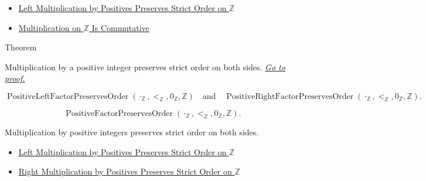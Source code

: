 \begin{dependencies}
\begin{itemize}
  \item \hyperref[thm:left-positive-multiplication-preserves-strict-order-on-z]{Left Multiplication by Positives Preserves Strict Order on $\mathbb{Z}$}
  \item \hyperref[thm:multiplication-on-z-commutative]{Multiplication on $\mathbb{Z}$ Is Commutative}
\end{itemize}
\end{dependencies}

\begin{theorembox}{Theorem}
\begin{theorem}
\label{thm:positive-multiplication-preserves-strict-order-on-z}
Multiplication by a positive integer preserves strict order on both sides.
\hyperref[prf:positive-multiplication-preserves-strict-order-on-z]{\textit{Go to proof.}}
\end{theorem}
\end{theorembox}

\begin{remark*}
\[
\operatorname{PositiveLeftFactorPreservesOrder}(\cdot_{\mathbb{Z}},<_{\mathbb{Z}},0_{\mathbb{Z}},\mathbb{Z})
\quad\text{and}\quad
\operatorname{PositiveRightFactorPreservesOrder}(\cdot_{\mathbb{Z}},<_{\mathbb{Z}},0_{\mathbb{Z}},\mathbb{Z}).
\]
\end{remark*}

\begin{remark*}
\[
\operatorname{PositiveFactorPreservesOrder}(\cdot_{\mathbb{Z}},<_{\mathbb{Z}},0_{\mathbb{Z}},\mathbb{Z}).
\]
\end{remark*}

\begin{remark*}[Interpretation]
Multiplication by positive integers preserves strict order on both sides.
\end{remark*}

\begin{dependencies}
\begin{itemize}
  \item \hyperref[thm:left-positive-multiplication-preserves-strict-order-on-z]{Left Multiplication by Positives Preserves Strict Order on $\mathbb{Z}$}
  \item \hyperref[cor:right-positive-multiplication-preserves-strict-order-on-z]{Right Multiplication by Positives Preserves Strict Order on $\mathbb{Z}$}
\end{itemize}
\end{dependencies}

